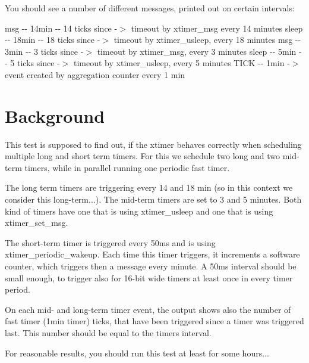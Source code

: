 You should see a number of different messages, printed out on certain intervals\+:

{\ttfamily msg -\/-\/ 14min -\/-\/ 14 ticks since} -\/$>$ timeout by xtimer\+\_\+msg every 14 minutes {\ttfamily sleep -\/-\/ 18min -\/-\/ 18 ticks since} -\/$>$ timeout by xtimer\+\_\+usleep, every 18 minutes {\ttfamily msg -\/-\/ 3min -\/-\/ 3 ticks since} -\/$>$ timeout by xtimer\+\_\+msg, every 3 minutes {\ttfamily sleep -\/-\/ 5min -\/-\/ 5 ticks since} -\/$>$ timeout by xtimer\+\_\+usleep, every 5 minutes {\ttfamily T\+I\+CK -\/-\/ 1min} -\/$>$ event created by aggregation counter every 1 min

\section*{Background }

This test is supposed to find out, if the {\ttfamily xtimer} behaves correctly when scheduling multiple long and short term timers. For this we schedule two \textquotesingle{}long\textquotesingle{} and two \textquotesingle{}mid\textquotesingle{}-\/term timers, while in parallel running one periodic fast timer.

The \textquotesingle{}long\textquotesingle{} term timers are triggering every 14 and 18 min (so in this context we consider this long-\/term...). The mid-\/term timers are set to 3 and 5 minutes. Both kind of timers have one that is using {\ttfamily xtimer\+\_\+usleep} and one that is using {\ttfamily xtimer\+\_\+set\+\_\+msg}.

The short-\/term timer is triggered every 50ms and is using {\ttfamily xtimer\+\_\+periodic\+\_\+wakeup}. Each time this timer triggers, it increments a software counter, which triggers then a message every minute. A 50ms interval should be small enough, to trigger also for 16-\/bit wide timers at least once in every timer period.

On each mid-\/ and long-\/term timer event, the output shows also the number of fast timer (1min timer) ticks, that have been triggered since a timer was triggered last. This number should be equal to the timers interval.

For reasonable results, you should run this test at least for some hours... 